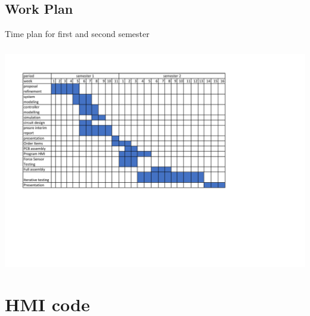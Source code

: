  \section{Work Plan}
 \begin{center}
 \begin{table}[!h]
 \centering
 \caption[Time plan]{Time plan for first and second semester}
 \paragraph{ }
 \includegraphics[width=0.95\linewidth]{Figures/workplan}
 \end{table}
 \end{center}
\chapter{HMI code}

